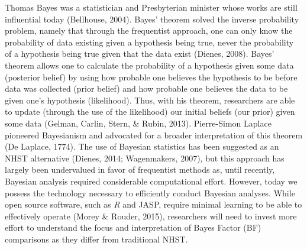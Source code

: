 \documentclass[,man, mask]{apa6}
\theoremstyle{definition}
\theoremstyle{definition}
\theoremstyle{definition}
\theoremstyle{remark}
\begin{document}
Thomas Bayes was a statistician and Presbyterian minister whose works
are still influential today (Bellhouse, 2004). Bayes' theorem solved the
inverse probability problem, namely that through the frequentist
approach, one can only know the probability of data existing given a
hypothesis being true, never the probability of a hypothesis being true
given that the data exist (Dienes, 2008). Bayes' theorem allows one to
calculate the probability of a hypothesis given some data (posterior
belief) by using how probable one believes the hypothesis to be before
data was collected (prior belief) and how probable one believes the data
to be given one's hypothesis (likelihood). Thus, with his theorem,
researchers are able to update (through the use of the likelihood) our
initial beliefs (our prior) given some data (Gelman, Carlin, Stern, \&
Rubin, 2013). Pierre-Simon Laplace pioneered Bayesianism and advocated
for a broader interpretation of this theorem (De Laplace, 1774). The use
of Bayesian statistics has been suggested as an NHST alternative
(Dienes, 2014; Wagenmakers, 2007), but this approach has largely been
undervalued in favor of frequentist methods as, until recently, Bayesian
analysis required considerable computational effort. However, today we
possess the technology necessary to efficiently conduct Bayesian
analyses. While open source software, such as \emph{R} and JASP, require
minimal learning to be able to effectively operate (Morey \& Rouder,
2015), researchers will need to invest more effort to understand the
focus and interpretation of Bayes Factor (BF) comparisons as they differ
from traditional NHST.
\end{document}
